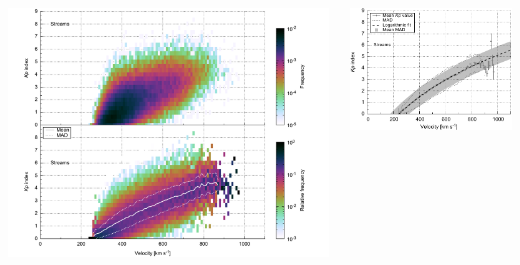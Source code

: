 \documentclass[11pt,aspectratio=1610]{beamer}	%
\newcommand{\captionoftiny}[2]{\captionof{#1}{\color{gray} \tiny #2}}
\begin{document}
\begin{frame}[c]{}{}
	\begin{columns}[c]
		
		\includegraphics[width=\textwidth]{../figures_of_mine/chapter2/Kp_2dhistogram_V_sws23_e.pdf}


		\includegraphics[width=\textwidth]{../figures_of_mine/chapter2/Kp_2dhistogram_V_sws23_fit_e.pdf}
	
	\end{columns}
\end{frame}
\end{document}
